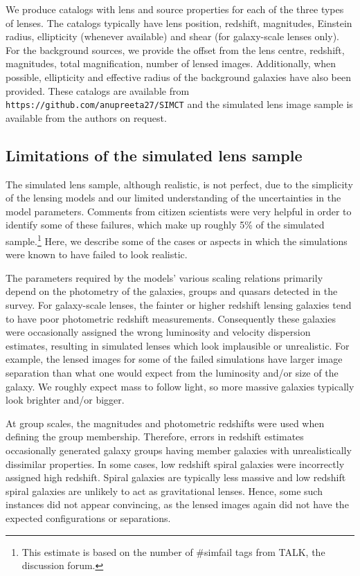 \documentclass[useAMS,usenatbib,a4paper]{mn2e}
\begin{document}
We produce catalogs with lens and source properties for each of the
three types of lenses.  The catalogs typically have lens position,
redshift, magnitudes, Einstein radius, ellipticity (whenever available)
and shear (for galaxy-scale lenses only). For the background sources, we
provide the offset from the lens centre, redshift, magnitudes, total
magnification, number of lensed images. Additionally, when possible,
ellipticity and effective radius of the background galaxies have also
been provided. These catalogs are available from
\texttt{https://github.com/anupreeta27/SIMCT} and the
simulated lens image sample is available from the authors on request.


\subsection{Limitations of the simulated lens sample}

The simulated lens sample, although realistic, is not perfect, due to
the simplicity of the lensing models and our limited understanding of
the uncertainties in the model parameters. Comments from citizen
scientists were very helpful in order to identify some of these failures, which
make up roughly 5\% of the simulated sample.\footnote{This estimate is
based on the number of \#simfail tags from TALK, the discussion forum.}
Here, we describe some of the cases or aspects in which the simulations
were known to have failed to look realistic.

The parameters required by the models' various scaling relations
primarily depend on the photometry of the galaxies, groups and quasars
detected in the survey. For galaxy-scale lenses, the fainter or higher redshift
lensing galaxies tend to have poor photometric redshift
measurements. Consequently these galaxies were occasionally assigned the wrong
luminosity and velocity dispersion estimates, resulting in
simulated lenses which look implausible or unrealistic.  For example,
the lensed images for some of the failed simulations have larger image
separation than what one would expect from the luminosity and/or size of the
galaxy. We roughly expect mass to follow light, so more massive galaxies
typically look brighter and/or bigger.

At group scales, the magnitudes and photometric redshifts were used when defining
the group membership. Therefore, errors in redshift estimates occasionally
generated galaxy
groups having member galaxies with unrealistically dissimilar properties.
In some cases,
low redshift spiral galaxies were incorrectly assigned high redshift.
Spiral galaxies are typically less massive and low redshift spiral galaxies are
unlikely to act as gravitational lenses. Hence, some such instances
did not appear convincing, as the lensed images again did not have the expected
configurations or separations.
\end{document}
